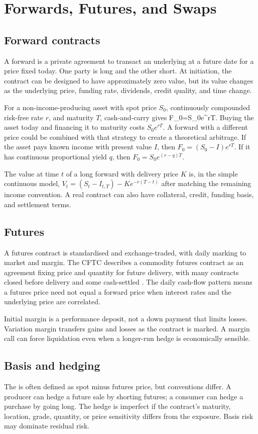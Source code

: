\chapter{Forwards, Futures, and Swaps}

\section{Forward contracts}
A forward is a private agreement to transact an underlying at a future date for a price fixed today. One party is long and the other short. At initiation, the contract can be designed to have approximately zero value, but its value changes as the underlying price, funding rate, dividends, credit quality, and time change.

For a non-income-producing asset with spot price $S_0$, continuously compounded risk-free rate $r$, and maturity $T$, cash-and-carry gives
  F_0=S_0e^{rT}.
\closeformula
Buying the asset today and financing it to maturity costs $S_0e^{rT}$. A forward with a different price could be combined with that strategy to create a theoretical arbitrage. If the asset pays known income with present value $I$, then $F_0=(S_0-I)e^{rT}$. If it has continuous proportional yield $q$, then $F_0=S_0e^{(r-q)T}$.

The value at time $t$ of a long forward with delivery price $K$ is, in the simple continuous model, $V_t=(S_t-I_{t,T})-Ke^{-r(T-t)}$ after matching the remaining income convention. A real contract can also have collateral, credit, funding basis, and settlement terms.

\section{Futures}
A futures contract is standardised and exchange-traded, with daily marking to market and margin. The CFTC describes a commodity futures contract as an agreement fixing price and quantity for future delivery, with many contracts closed before delivery and some cash-settled \cite{cftc2026}. The daily cash-flow pattern means a futures price need not equal a forward price when interest rates and the underlying price are correlated.

Initial margin is a performance deposit, not a down payment that limits losses. Variation margin transfers gains and losses as the contract is marked. A margin call can force liquidation even when a longer-run hedge is economically sensible.

\section{Basis and hedging}
The  is often defined as spot minus futures price, but conventions differ. A producer can hedge a future sale by shorting futures; a consumer can hedge a purchase by going long. The hedge is imperfect if the contract's maturity, location, grade, quantity, or price sensitivity differs from the exposure. Basis risk may dominate residual risk.


